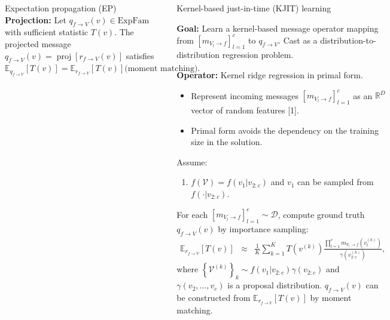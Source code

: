 \documentclass[english]{beamer}
\DeclareMathOperator*{\proj}{\text{proj}} %
\begin{document}
\begin{frame}
\begin{columns}[t]
\begin{block}{Expectation propagation (EP)}
%
\vspace{1cm}
\textbf{Projection:} Let $q_{f\rightarrow V}(v)\in\text{ExpFam}$
with sufficient statistic $T(v)$. The projected message $q_{f\rightarrow V}(v)=\proj\left[r_{f\rightarrow V}(v)\right]$
satisfies $\mathbb{E}_{q_{f\rightarrow V}}\left[T(v)\right]=\mathbb{E}_{r_{f\rightarrow V}}\left[T(v)\right] \text{(moment matching).}$

%
\end{block}



\begin{block}{Kernel-based just-in-time (KJIT) learning }

\justifying{}\textbf{Goal:} Learn a kernel-based message operator mapping from
$\left[m_{V_{l}\rightarrow f}\right]_{l=1}^{c}$ to $q_{f\rightarrow V}$.
Cast as a distribution-to-distribution regression problem. \vspace*{4mm}

\textbf{Operator: }Kernel ridge regression in primal form. 
\begin{itemize}
\item Represent incoming messages $\left[m_{V_{l}\rightarrow f}\right]_{l=1}^{c}$
as an $\mathbb{R}^{D}$ vector of random features {[}1{]}. 
\item Primal form avoids the dependency on the training size in the solution.
\end{itemize}

Assume: 
\begin{enumerate}
\item \justifying{}$f(\mathcal{V})=f(v_{1}|v_{2:c})$ and $v_{1}$ can
be sampled from $f(\cdot|v_{2:c})$. 
\end{enumerate}

For each $\left[m_{V_{l}\rightarrow f}\right]_{l=1}^{c}\sim\mathcal{D}$,
compute ground truth $q_{f\rightarrow V}(v)$ by importance sampling:
%
\begin{eqnarray*}
\mathbb{E}_{r_{f\rightarrow V}}\left[T(v)\right] & \approx & \frac{1}{K}\sum_{k=1}^{K}T(v^{(k)})\frac{\prod_{l=1}^{c}m_{V_{l}\rightarrow f}(v_{l}^{(k)})}{\gamma(v_{2:c}^{(k)})},
\end{eqnarray*}
where $\left\{ \mathcal{V}^{(k)}\right\} _{k}\sim f(v_{1}|v_{2:c})\gamma(v_{2:c})$
and $\gamma(v_{2},\ldots,v_{c})$ is a proposal distribution. $q_{f\rightarrow V}(v)$
can be constructed from $\mathbb{E}_{r_{f\rightarrow V}}\left[T(v)\right]$ by moment matching.



\end{block}
\end{columns}
\end{frame}
\end{document}
